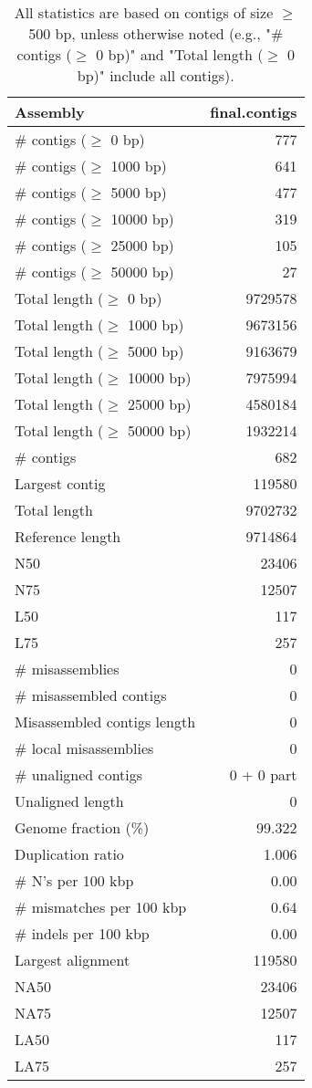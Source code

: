 \documentclass[12pt,a4paper]{article}
\begin{document}
\begin{table}[ht]
\begin{center}
\caption{All statistics are based on contigs of size $\geq$ 500 bp, unless otherwise noted (e.g., "\# contigs ($\geq$ 0 bp)" and "Total length ($\geq$ 0 bp)" include all contigs).}
\begin{tabular}{|l*{1}{|r}|}
\hline
Assembly & final.contigs \\ \hline
\# contigs ($\geq$ 0 bp) & 777 \\ \hline
\# contigs ($\geq$ 1000 bp) & 641 \\ \hline
\# contigs ($\geq$ 5000 bp) & 477 \\ \hline
\# contigs ($\geq$ 10000 bp) & 319 \\ \hline
\# contigs ($\geq$ 25000 bp) & 105 \\ \hline
\# contigs ($\geq$ 50000 bp) & 27 \\ \hline
Total length ($\geq$ 0 bp) & 9729578 \\ \hline
Total length ($\geq$ 1000 bp) & 9673156 \\ \hline
Total length ($\geq$ 5000 bp) & 9163679 \\ \hline
Total length ($\geq$ 10000 bp) & 7975994 \\ \hline
Total length ($\geq$ 25000 bp) & 4580184 \\ \hline
Total length ($\geq$ 50000 bp) & 1932214 \\ \hline
\# contigs & 682 \\ \hline
Largest contig & 119580 \\ \hline
Total length & 9702732 \\ \hline
Reference length & 9714864 \\ \hline
N50 & 23406 \\ \hline
N75 & 12507 \\ \hline
L50 & 117 \\ \hline
L75 & 257 \\ \hline
\# misassemblies & 0 \\ \hline
\# misassembled contigs & 0 \\ \hline
Misassembled contigs length & 0 \\ \hline
\# local misassemblies & 0 \\ \hline
\# unaligned contigs & 0 + 0 part \\ \hline
Unaligned length & 0 \\ \hline
Genome fraction (\%) & 99.322 \\ \hline
Duplication ratio & 1.006 \\ \hline
\# N's per 100 kbp & 0.00 \\ \hline
\# mismatches per 100 kbp & 0.64 \\ \hline
\# indels per 100 kbp & 0.00 \\ \hline
Largest alignment & 119580 \\ \hline
NA50 & 23406 \\ \hline
NA75 & 12507 \\ \hline
LA50 & 117 \\ \hline
LA75 & 257 \\ \hline
\end{tabular}
\end{center}
\end{table}
\end{document}
